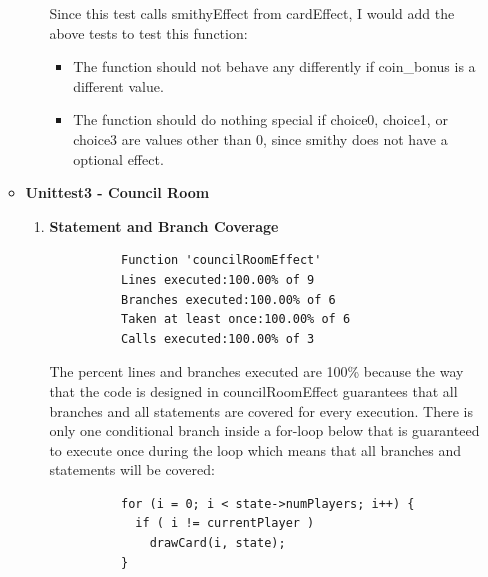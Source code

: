 \documentclass[11pt,letterpaper]{article}
\begin{document}
\begin{enumerate}[label=\Roman*.]
\begin{itemize}[leftmargin=*]
\begin{enumerate}[leftmargin=*]
          Since this test calls smithyEffect from cardEffect, I would add the above tests
            to test this function:
          \begin{itemize}
            \item The function should not behave any differently if coin\_bonus is 
              a different value. 
            \item The function should do nothing special if choice0, choice1, or choice3 
              are values other than 0, since smithy does not have a optional effect.
          \end{itemize}
        \end{enumerate}

      \item \textbf{Unittest3 - Council Room}
      
        \begin{enumerate}[leftmargin=*]
          \item \textbf{Statement and Branch Coverage}

          \begin{lstlisting}
          Function 'councilRoomEffect'
          Lines executed:100.00% of 9
          Branches executed:100.00% of 6
          Taken at least once:100.00% of 6
          Calls executed:100.00% of 3
          \end{lstlisting}
          
            The percent lines and branches executed are 100\% because the way that the
            code is designed in councilRoomEffect guarantees that all branches
            and all statements are covered for every execution. There is only
            one conditional branch inside a for-loop below that is guaranteed
            to execute once during the loop which means that all branches
            and statements will be covered:

          \begin{lstlisting}
          for (i = 0; i < state->numPlayers; i++) {
            if ( i != currentPlayer )
              drawCard(i, state);
          }
          \end{lstlisting}


\end{enumerate}
\end{itemize}
\end{enumerate}
\end{document}
